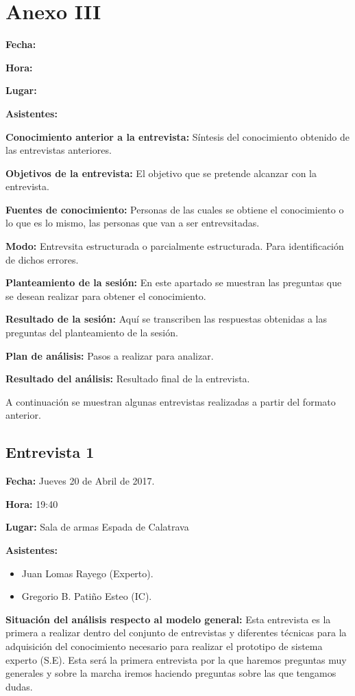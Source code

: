 \chapter{Anexo III}
\label{cap:Entrevsitas}

\textbf{Fecha:}


\textbf{Hora:}

\textbf{Lugar:}

\textbf{Asistentes:}

\textbf{Conocimiento anterior a la entrevista:} Síntesis del conocimiento obtenido
 de las entrevistas anteriores.

\textbf{Objetivos de la entrevista:} El objetivo que se pretende alcanzar con la entrevista.

\textbf{Fuentes de conocimiento:} Personas de las cuales se obtiene el conocimiento o
 lo que es lo mismo, las personas que van a ser entrevsitadas.

\textbf{Modo:} Entrevsita estructurada o parcialmente estructurada. Para identificación de
 dichos errores.

\textbf{Planteamiento de la sesión:} En este apartado se muestran las preguntas que se desean
 realizar para obtener el conocimiento.

\textbf{Resultado de la sesión:} Aquí se transcriben las respuestas obtenidas a las preguntas
 del planteamiento de la sesión.

\textbf{Plan de análisis:} Pasos a realizar para analizar.

\textbf{Resultado del análisis:} Resultado final de la entrevista.


A continuación se muestran algunas entrevistas realizadas a partir del formato anterior.

\section{Entrevista 1}

\textbf{Fecha:} Jueves 20 de Abril de 2017.

\textbf{Hora:} 19:40

\textbf{Lugar:} Sala de armas Espada de Calatrava

\textbf{Asistentes:}
  \begin{itemize}
    \item Juan Lomas Rayego (Experto).
    \item Gregorio B. Patiño Esteo (IC).
  \end{itemize}

\textbf{Situación del análisis respecto al modelo general:} Esta entrevista es la primera a realizar dentro del conjunto de entrevistas y diferentes técnicas
 para la adquisición del conocimiento necesario para realizar el prototipo de sistema experto
 (S.E). Esta será la primera entrevista por la que haremos preguntas muy generales y sobre la
 marcha iremos haciendo preguntas sobre las que tengamos dudas.

